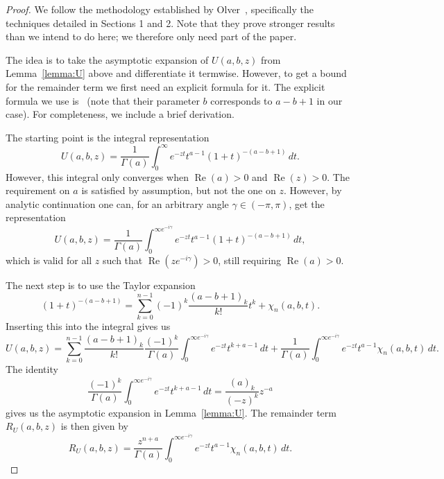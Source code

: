 \documentclass[11pt]{article}
\DeclareMathOperator{\real}{Re}
\begin{document}
\begin{proof}
  We follow the methodology established by Olver~\cite{Olver1991b},
  specifically the techniques detailed in Sections 1 and 2. Note that
  they prove stronger results than we intend to do here; we therefore
  only need part of the paper.

  The idea is to take the asymptotic expansion of \(U(a, b, z)\) from
  Lemma~\ref{lemma:U} above and differentiate it termwise. However, to
  get a bound for the remainder term we first need an explicit formula
  for it. The explicit formula we use is~\cite[Equation
  2.5]{Olver1991b} (note that their parameter \(b\) corresponds to
  \(a - b + 1\) in our case). For completeness, we include a brief
  derivation.

  The starting point is the integral representation
  \begin{equation*}
    U(a, b, z) = \frac{1}{\Gamma(a)} \int_{0}^{\infty}e^{-zt}t^{a - 1}(1 + t)^{-(a - b + 1)}\,dt.
  \end{equation*}
  However, this integral only converges when \(\real(a) > 0\) and
  \(\real(z) > 0\). The requirement on \(a\) is satisfied by
  assumption, but not the one on \(z\). However, by analytic
  continuation one can, for an arbitrary angle
  \(\gamma \in (-\pi, \pi)\), get the representation
  \begin{equation*}
    U(a, b, z) = \frac{1}{\Gamma(a)} \int_{0}^{\infty e^{-i\gamma}}e^{-zt}t^{a - 1}(1 + t)^{-(a - b + 1)}\,dt,
  \end{equation*}
  which is valid for all \(z\) such that \(\real(ze^{-i\gamma}) > 0\),
  still requiring \(\real(a) > 0\).

  The next step is to use the Taylor expansion
  \begin{equation*}
    (1 + t)^{-(a - b + 1)} =
    \sum_{k = 0}^{n - 1}(-1)^{k}\frac{(a - b + 1)_{k}}{k!}t^{k} + \chi_{n}(a, b, t).
  \end{equation*}
  Inserting this into the integral gives us
  \begin{equation*}
    U(a, b, z) = \sum_{k = 0}^{n - 1}\frac{(a - b + 1)_{k}}{k!}
    \frac{(-1)^{k}}{\Gamma(a)}
    \int_{0}^{\infty e^{-i\gamma}}e^{-zt}t^{k + a - 1}\,dt
    + \frac{1}{\Gamma(a)} \int_{0}^{\infty e^{-i\gamma}}e^{-zt}t^{a - 1}\chi_{n}(a, b, t)\,dt.
  \end{equation*}
  The identity
  \begin{equation*}
    \frac{(-1)^{k}}{\Gamma(a)}
    \int_{0}^{\infty e^{-i\gamma}}e^{-zt}t^{k + a - 1}\,dt
    = \frac{(a)_{k}}{(-z)^{k}}z^{-a}
  \end{equation*}
  gives us the asymptotic expansion in Lemma~\ref{lemma:U}. The
  remainder term \(R_{U}(a, b, z)\) is then given by
  \begin{equation*}
    R_{U}(a, b, z) = \frac{z^{n + a}}{\Gamma(a)} \int_{0}^{\infty e^{-i\gamma}}e^{-zt}t^{a - 1}\chi_{n}(a, b, t)\,dt.
  \end{equation*}


\end{proof}
\end{document}
